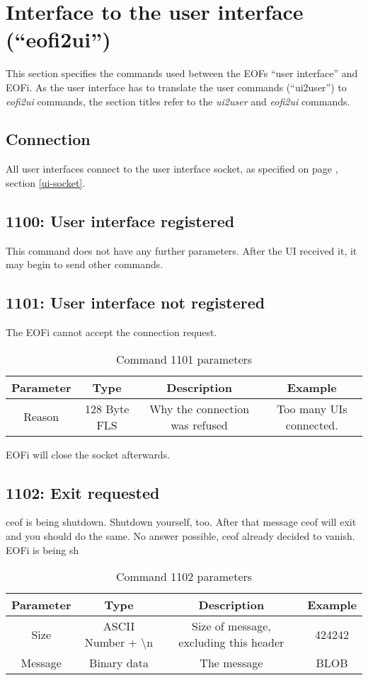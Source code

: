 \documentclass[12pt,a4paper]{book}
\begin{document}
\section{Interface to the user interface ("`eofi2ui"')}
This section specifies the commands used between the EOFs
"`user interface"' and EOFi. As the user interface has to translate
the user commands ("`ui2user"') to \emph{eofi2ui} commands, the
section titles refer to the \emph{ui2user} and \emph{eofi2ui} commands.
\subsection{Connection}
All user interfaces connect to the user interface socket, as specified
on page \pageref{ui-socket}, section \ref{ui-socket}.
\subsection{1100: User interface registered}
This command does not have any further parameters.
After the UI received it, it may begin to send other commands.
\subsection{1101: User interface not registered}
The EOFi cannot accept the connection request.
\begin{longtable}{|c|c|c|c|}
\caption{Command 1101 parameters}\\
\hline
\textbf{Parameter} & \textbf{Type} & \textbf{Description} & \textbf{Example}\\
\hline
Reason & 128 Byte FLS & Why the connection was refused & Too many UIs connected.\\
\hline
\end{longtable}
EOFi will close the socket afterwards.
\subsection{1102: Exit requested}
ceof is being shutdown.
Shutdown yourself, too.
After that message ceof will exit and you should do the same.
No answer possible, ceof already decided to vanish.
EOFi is being sh
\begin{longtable}{|c|c|c|c|}
\caption{Command 1102 parameters}\\
\hline
\textbf{Parameter} & \textbf{Type} & \textbf{Description} & \textbf{Example}\\
\hline
Size & ASCII Number + \textbackslash{}n & Size of message, excluding this header & 424242\\
\hline
Message & Binary data & The message & BLOB\\
\hline
\end{longtable}
\end{document}
